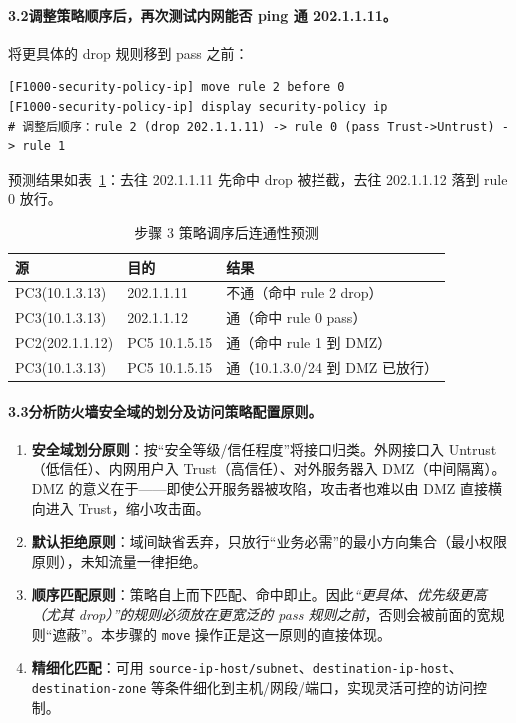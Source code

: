 \documentclass[12pt,a4paper]{article}
\begin{document}
\paragraph{3.2\quad 调整策略顺序后，再次测试内网能否 ping 通 202.1.1.11。}
将更具体的 drop 规则移到 pass 之前：
\begin{lstlisting}
[F1000-security-policy-ip] move rule 2 before 0
[F1000-security-policy-ip] display security-policy ip
# 调整后顺序：rule 2 (drop 202.1.1.11) -> rule 0 (pass Trust->Untrust) -> rule 1
\end{lstlisting}
预测结果如表~\ref{tab:ping2}：去往 202.1.1.11 先命中 drop 被拦截，去往 202.1.1.12 落到 rule 0 放行。
\begin{table}[H]
\centering\caption{步骤 3 策略调序后连通性预测}\label{tab:ping2}
\small
\begin{tabular}{@{}lll@{}}
\toprule
源 & 目的 & 结果 \\
\midrule
PC3(10.1.3.13) & 202.1.1.11 & 不通（命中 rule 2 drop） \\
PC3(10.1.3.13) & 202.1.1.12 & 通（命中 rule 0 pass） \\
PC2(202.1.1.12)& PC5 10.1.5.15 & 通（命中 rule 1 到 DMZ） \\
PC3(10.1.3.13) & PC5 10.1.5.15 & 通（10.1.3.0/24 到 DMZ 已放行） \\
\bottomrule
\end{tabular}
\end{table}

\paragraph{3.3\quad 分析防火墙安全域的划分及访问策略配置原则。}
\begin{enumerate}[leftmargin=1.8em]
  \item \textbf{安全域划分原则}：按“安全等级/信任程度”将接口归类。外网接口入 Untrust（低信任）、内网用户入 Trust（高信任）、对外服务器入 DMZ（中间隔离）。DMZ 的意义在于——即使公开服务器被攻陷，攻击者也难以由 DMZ 直接横向进入 Trust，缩小攻击面。
  \item \textbf{默认拒绝原则}：域间缺省丢弃，只放行“业务必需”的最小方向集合（最小权限原则），未知流量一律拒绝。
  \item \textbf{顺序匹配原则}：策略自上而下匹配、命中即止。因此\emph{“更具体、优先级更高（尤其 drop）”的规则必须放在更宽泛的 pass 规则之前}，否则会被前面的宽规则“遮蔽”。本步骤的 \texttt{move} 操作正是这一原则的直接体现。
  \item \textbf{精细化匹配}：可用 \texttt{source-ip-host/subnet}、\texttt{destination-ip-host}、\texttt{destination-zone} 等条件细化到主机/网段/端口，实现灵活可控的访问控制。
\end{enumerate}
\end{document}
